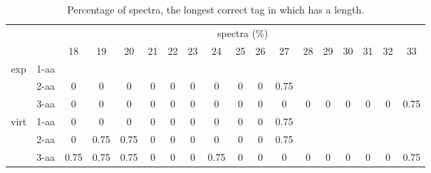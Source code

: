 \documentclass{article}
\begin{document}
\begin{table}[h]\tiny
\vspace{3mm}
{\centering
\begin{center}
\begin{tabular}{|c|l|c|c|c|c|c|c|c|c|c|c|c|c|c|c|c|c|}
  \hline
  \multicolumn{2}{|c|}{ } & \multicolumn{ 16 }{|c|}{ spectra (\%)} \\
  \cline{3- 18}
  \multicolumn{2}{|c|}{ }  & 18 & 19 & 20 & 21 & 22 & 23 & 24 & 25 & 26 & 27 & 28 & 29 & 30 & 31 & 32 & 33\\
  \hline
  \multirow{3}{*}{exp}
&  1-aa  &  &  &  &  &  &  &  &  &  &  &  &  &  &  &  & \\&  2-aa  & 0 & 0 & 0 & 0 & 0 & 0 & 0 & 0 & 0 & 0.75 &  &  &  &  &  & \\&  3-aa  & 0 & 0 & 0 & 0 & 0 & 0 & 0 & 0 & 0 & 0 & 0 & 0 & 0 & 0 & 0 & 0.75\\ \hline
  \multirow{3}{*}{virt} 
&  1-aa  & 0 & 0 & 0 & 0 & 0 & 0 & 0 & 0 & 0 & 0.75 &  &  &  &  &  & \\&  2-aa  & 0 & 0.75 & 0.75 & 0 & 0 & 0 & 0 & 0 & 0 & 0.75 &  &  &  &  &  & \\&  3-aa  & 0.75 & 0.75 & 0.75 & 0 & 0 & 0 & 0.75 & 0 & 0 & 0 & 0 & 0 & 0 & 0 & 0 & 0.75\\ \hline
\end{tabular}
\end{center}
\par}
\centering
\caption{ Percentage of spectra, the longest correct tag in which has a length.}
\vspace{3mm}
\label{table:table8}
\end{table}
\end{document}
